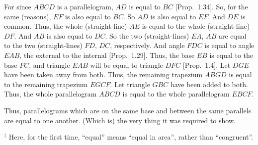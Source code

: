 \begin{Parallel}{}{}
{For since $ABCD$ is a parallelogram, $AD$ is equal to $BC$ [Prop.~1.34].
So, for the same (reasons), $EF$ is also equal to $BC$. So $AD$ is also equal to
$EF$. And $DE$ is common. Thus, the whole (straight-line) $AE$ is equal
to the whole (straight-line) $DF$.  And $AB$ is also equal to $DC$.
So the two (straight-lines) $EA$, $AB$
are equal to the two (straight-lines) $FD$, $DC$, respectively. And angle $FDC$ is
equal to angle $EAB$, the external to the internal [Prop.~1.29]. Thus, the
base $EB$ is equal to the base $FC$, and triangle $EAB$ will be equal to triangle
$DFC$ [Prop.~1.4]. Let $DGE$ have been taken away from both. 
Thus, the remaining trapezium $ABGD$ is equal to the remaining trapezium
$EGCF$. Let triangle $GBC$ have been added to both. Thus, the whole
parallelogram $ABCD$ is equal to the whole parallelogram $EBCF$.

Thus, parallelograms which are on the same base and between the same
parallels are equal to one another. (Which is) the very thing it was required to
show.}
\end{Parallel}
{\footnotesize \noindent$^\dag$ Here, for the first time, ``equal'' means
``equal in area'', rather than ``congruent''.}

